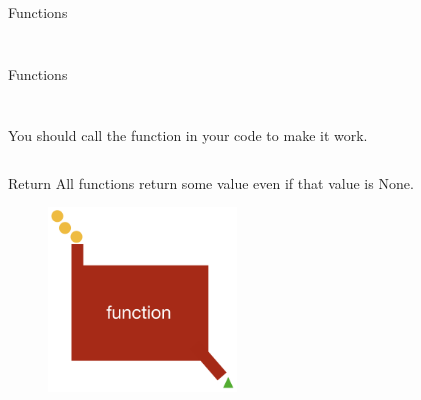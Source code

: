         \begin{frame}{}
        
            \inputminted[frame=single,framesep=2pt, lastline=8]{python3}{code-examples/function_def.py}
            \inputminted[frame=single,framesep=2pt, lastline=8]{python3}{code-examples/function_def2.py}
            \inputminted[frame=single,framesep=2pt, lastline=8]{python3}{code-examples/function_def3.py}
        
        \end{frame}


        \begin{frame}{Functions}
            \inputminted[frame=single,framesep=2pt, lastline=8]{python3}{code-examples/function_ex.py}
            \inputminted[frame=single,framesep=2pt, lastline=8]{python3}{code-examples/function_ex2.py}
        \end{frame}

        \begin{frame}{Functions}
            \begin{columns}
                \begin{column}{0.50\textwidth}
                \inputminted[frame=single,framesep=2pt, lastline=8]{python3}{code-examples/function_ex3.py}
                You should call the function in your code to make it work.
                \end{column}
                \begin{column}{0.50\textwidth}
                \inputminted[frame=single,framesep=2pt, lastline=15]{python3}{code-examples/function_ex4.py}
                \end{column}
            \end{columns}
        \end{frame}

        \begin{frame}{Return}
        All functions return some value even if that value is None.
            \begin{figure}[H]
                \centering
                \includegraphics[width=50mm]{code-examples/function.png}
                \end{figure}
        \end{frame}

